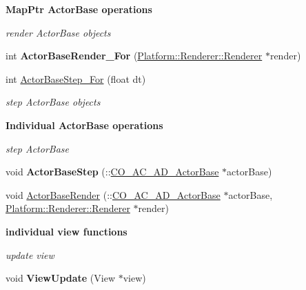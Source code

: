 \begin{Indent}{\bf MapPtr ActorBase operations}\par
{\em \label{_amgrp61212cb9feae85dabb2f0d2410cb68a0}
 render ActorBase objects }\begin{DoxyCompactItemize}
\item 
\hypertarget{classContent_1_1CO__SC__AD__Scene_ac42a4394247435cacb1183c9dcf04bbb}{
int {\bfseries ActorBaseRender\_\-For} (\hyperlink{classPlatform_1_1Renderer_1_1Renderer}{Platform::Renderer::Renderer} $\ast$render)}
\label{classContent_1_1CO__SC__AD__Scene_ac42a4394247435cacb1183c9dcf04bbb}

\item 
\hypertarget{classContent_1_1CO__SC__AD__Scene_ad6b2ee5236691e50004a16ebc48cbed4}{
int \hyperlink{classContent_1_1CO__SC__AD__Scene_ad6b2ee5236691e50004a16ebc48cbed4}{ActorBaseStep\_\-For} (float dt)}
\label{classContent_1_1CO__SC__AD__Scene_ad6b2ee5236691e50004a16ebc48cbed4}

\begin{DoxyCompactList}\small\item\em step ActorBase objects \item\end{DoxyCompactList}\end{DoxyCompactItemize}
\end{Indent}
\begin{Indent}{\bf Individual ActorBase operations}\par
{\em \label{_amgrpbbc3c30f8b1ae7bdeff2a0b529da0242}
 step ActorBase }\begin{DoxyCompactItemize}
\item 
\hypertarget{classContent_1_1CO__SC__AD__Scene_a8dcc8d7c0a525f319e66cb1a5c29a0fa}{
void {\bfseries ActorBaseStep} (::\hyperlink{classContent_1_1Actor_1_1Admin_1_1ActorBase}{CO\_\-AC\_\-AD\_\-ActorBase} $\ast$actorBase)}
\label{classContent_1_1CO__SC__AD__Scene_a8dcc8d7c0a525f319e66cb1a5c29a0fa}

\item 
void \hyperlink{classContent_1_1CO__SC__AD__Scene_ae463b7b590511a583097c5b37920d0ff}{ActorBaseRender} (::\hyperlink{classContent_1_1Actor_1_1Admin_1_1ActorBase}{CO\_\-AC\_\-AD\_\-ActorBase} $\ast$actorBase, \hyperlink{classPlatform_1_1Renderer_1_1Renderer}{Platform::Renderer::Renderer} $\ast$render)
\end{DoxyCompactItemize}
\end{Indent}
\begin{Indent}{\bf individual view functions}\par
{\em \label{_amgrpc7b082c0387da43bf749d0d553895023}
 update view }\begin{DoxyCompactItemize}
\item 
\hypertarget{classContent_1_1CO__SC__AD__Scene_a10937eb02a59ae8fb9fb6d55245f4846}{
void {\bfseries ViewUpdate} (View $\ast$view)}
\label{classContent_1_1CO__SC__AD__Scene_a10937eb02a59ae8fb9fb6d55245f4846}

\end{DoxyCompactItemize}
\end{Indent}
